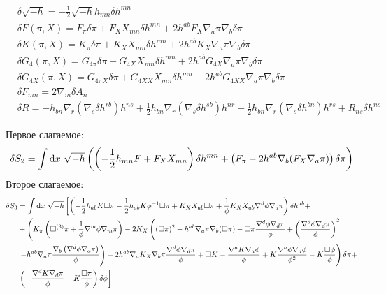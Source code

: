 \documentclass[12pt,a4paper,svgnames]{extarticle}
\begin{document}
\begin{align*}
&\delta{\sqrt{-h}} =  - \frac{1}{2}\sqrt{-h} h_{m n} \delta h^{m n}\\
&\delta{F(\pi, X)} = F_{\pi} \delta\pi+F_{X} X_{m n} \delta h^{m n}+2h^{a b} F_{X} \nabla_{a}{\pi} \nabla_{b}{\delta\pi}\\
&\delta{K(\pi, X)} = K_{\pi} \delta\pi+K_{X} X_{m n} \delta h^{m n}+2h^{a b} K_{X} \nabla_{a}{\pi} \nabla_{b}{\delta\pi}\\
&\delta G_{4}(\pi, X) = G_{4\pi} \delta\pi+G_{4X} X_{m n} \delta h^{m n}+2h^{a b} G_{4X} \nabla_{a}{\pi} \nabla_{b}{\delta\pi}\\
&\delta{G_{4X}(\pi, X)} = G_{4\pi X} \delta\pi+G_{4XX} X_{m n} \delta h^{m n}+2h^{a b} G_{4XX} \nabla_{a}{\pi} \nabla_{b}{\delta\pi}\\
&\delta{F_{m n}} = 2\nabla_{m}{\delta A_{n}}\\
&\delta{R} = -h_{b n} \nabla_{r}({\nabla_{s}{\delta h^{r b}}}) h^{n s}+\frac{1}{2}h_{b n} \nabla_{r}({\nabla_{s}{\delta h^{s b}}}) h^{n r}+\frac{1}{2}h_{b n} \nabla_{r}({\nabla_{s}{\delta h^{b n}}}) h^{r s}+R_{n s} \delta h^{n s}
\end{align*}

Первое слагаемое:
\begin{align*}
	 \delta S_{2} = \int{\rm d}x\,\, \sqrt{-h} \left( \left({ - \frac{1}{2}h_{m n} F+F_{X} X_{m n}}\right)\delta h^{m n}+  \left(F_{\pi}-2h^{a b} \nabla_{b}(F_{X} \nabla_{a}{\pi})\right)\delta\pi\right)
\end{align*}
Второе слагаемое:
\begin{align*}
	\delta S_{3} &= \int {\rm d}x\,\, \sqrt{-h}\left[\left( - \frac{1}{2}h_{a b} K \Box{\pi}- \frac{1}{2}h_{a b} K {\phi}^{-1}\Box{\pi} +K_{X} X_{a b} \Box{\pi}+ \frac{1}{\phi}K_{X} X_{a b}   \nabla^{d}{\phi} \nabla_{d}{\pi}\right)\delta{h^{a b}}+\right.\\
	& +\left(K_{\pi} \left(\Box^{(3)}\pi+ \frac{1}{\phi}\nabla^{m}{\phi} \nabla_{m}{\pi}\right) - 2 K_{X} \left((\Box{\pi})^2-h^{a b}\nabla_{a}{\pi}\nabla_{b}(\Box{\pi}) - \Box{\pi}\frac{\nabla^{d}{\phi} \nabla_{d}{\pi}}{\phi}+ \left(\frac{\nabla^{d}{\phi} \nabla_{d}{\pi}}{\phi}\right)^{2}\right.\right. \\
	&\left.\left.-h^{a b} \nabla_{a}{\pi} \frac{\nabla_{b}\left(\nabla^{d}{\phi}\nabla_{d}{\pi}\right)}{\phi}\right) -2h^{a b} \nabla_{a}{K_{X}} \nabla_{b}{\pi} \frac{\nabla^{d}{\phi} \nabla_{d}{\pi}}{\phi} + \Box{K} -\frac{\nabla^{a}{K}\nabla_{a}{\phi}}{\phi}+K \frac{\nabla^{a}{\phi} \nabla_{a}{\phi}}{{\phi}^{2}} - K \frac{\Box{\phi}}{\phi} \right)\delta{\pi} +\\
	&\left.  \left(- \frac{\nabla^{d}{K}\nabla_{d}{\pi}}{\phi} - K \frac{\Box{\pi}}{\phi}\right)\delta\phi\right]
\end{align*}
\end{document}
